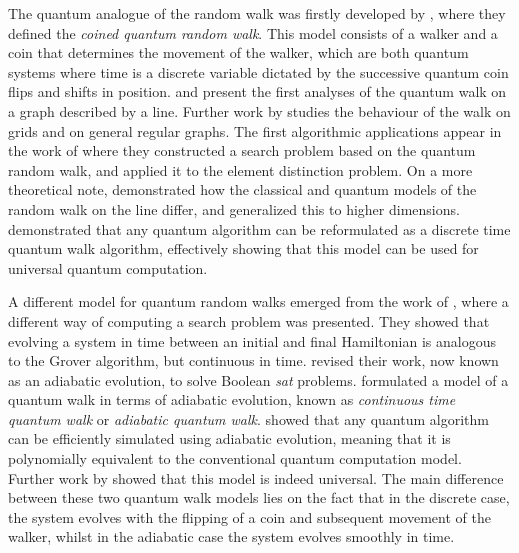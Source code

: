\documentclass[../../dissertation.tex]{subfiles}
\begin{document}
The quantum analogue of the random walk was firstly developed by
\cite{aharonov1993}, where they defined the \textit{coined quantum random
walk}.  This model consists of a walker and a coin that determines the movement
of the walker, which are both quantum systems where time is a discrete variable
dictated by the successive quantum coin flips and shifts in position.
\cite{nayak2000} and \cite{aharonov2002}  present the first analyses of the
quantum walk on a graph described by a line. Further work by \cite{inui2003}
studies the behaviour of the walk on grids and \cite{aharonov2002} on general
regular graphs. The first algorithmic applications appear in the work of
\cite{shenvi2002} where they constructed a search problem based on the quantum
random walk, and \cite{ambainis2003} applied it to the element distinction
problem. On a more theoretical note, \cite{konno2002} demonstrated how the
classical and quantum models of the random walk on the line differ, and
\cite{grimmett2003} generalized this to higher dimensions. \cite{lovett2010} demonstrated
that any quantum algorithm can be reformulated as a discrete time quantum walk
algorithm, effectively showing that this model can be used for universal quantum
computation.\par

A different model for quantum random walks emerged from the work of
\cite{farhi1996}, where a different way of computing a search problem was
presented. They showed that evolving a system in time between an initial and
final Hamiltonian is analogous to the Grover algorithm, but continuous in time.
\cite{farhi2000} revised their work, now known as an adiabatic evolution, to
solve Boolean \textit{sat} problems. \cite{childs2004} formulated a model of a
quantum walk in terms of adiabatic evolution, known as \textit{continuous time
quantum walk} or \textit{adiabatic quantum walk}. \cite{aharonov2005} showed
that any quantum algorithm can be efficiently simulated using adiabatic
evolution, meaning that it is polynomially equivalent to the conventional
quantum computation model. Further work by \cite{childs2009} showed that this
model is indeed universal. The main difference between these two quantum walk
models lies on the fact that in the discrete case, the system evolves with
the flipping of a coin and subsequent movement of the walker, whilst in the
adiabatic case the system evolves smoothly in time.\par 
\end{document}
